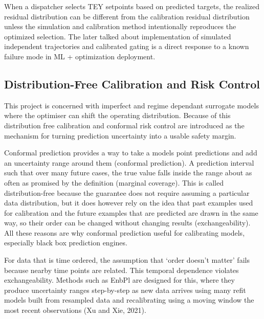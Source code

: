 \documentclass[11pt]{article}
\begin{document}
When a dispatcher selects TEY setpoints based on predicted targets, the
realized residual distribution can be different from the calibration
residual distribution unless the simulation and calibration method
intentionally reproduces the optimized selection. The later talked about
implementation of simulated independent trajectories and calibrated
gating is a direct response to a known failure mode in ML + optimization
deployment.

\subsection{}\label{section-6}

\subsection{Distribution-Free Calibration and Risk
Control}\label{distribution-free-calibration-and-risk-control}

This project is concerned with imperfect and regime dependant surrogate
models where the optimiser can shift the operating distribution. Because
of this distribution free calibration and conformal risk control are
introduced as the mechanism for turning prediction uncertainty into a
usable safety margin.

Conformal prediction provides a way to take a models point predictions
and add an uncertainty range around them (conformal prediction). A
prediction interval such that over many future cases, the true value
falls inside the range about as often as promised by the definition
(marginal coverage). This is called distribution-free because the
guarantee does not require assuming a particular data distribution, but
it does however rely on the idea that past examples used for calibration
and the future examples that are predicted are drawn in the same way, so
their order can be changed without changing results (exchangeability).
All these reasons are why conformal prediction useful for calibrating
models, especially black box prediction engines.

For data that is time ordered, the assumption that `order doesn't
matter' fails because nearby time points are related. This temporal
dependence violates exchangeability. Methods such as EnbPl are designed
for this, where they produce uncertainty ranges step-by-step as new data
arrives using many refit models built from resampled data and
recalibrating using a moving window the most recent observations (Xu and
Xie, 2021).
\end{document}
